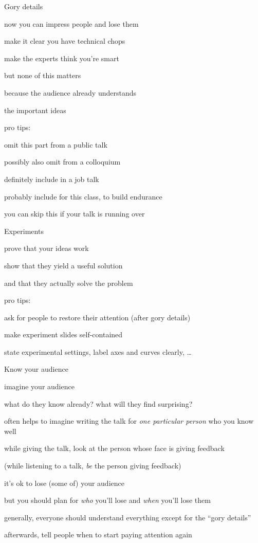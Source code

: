 \documentclass[presentation,xcolor={usenames,dvipsnames}]{beamer}
\begin{document}
\begin{frame}{Gory details}

\bit
\item now you can impress people and lose them
\item make it clear you have technical chops
\item make the experts think you're smart
\item but none of this matters
\item because the audience already understands
\item the important ideas
\eit

pro tips:
\bit
\item omit this part from a public talk
\item possibly also omit from a colloquium
\item definitely include in a job talk
\item probably include for this class, to build endurance
\item you can skip this if your talk is running over
\eit

\end{frame}

\begin{frame}{Experiments}

\bit
\item prove that your ideas work
\item show that they yield a useful solution
\item and that they actually solve the problem
\eit

pro tips:
\bit
\item ask for people to restore their attention (after gory details)
\item make experiment slides self-contained
\bit
\item state experimental settings, label axes and curves clearly, \ldots
\eit
\eit

\end{frame}

\begin{frame}{Know your audience}

imagine your audience
\bit
\item what do they know already? what will they find surprising?
\item often helps to imagine writing the talk for \emph{one particular person} who you know well
\item while giving the talk, look at the person whose face is giving feedback
\item (while listening to a talk, \emph{be} the person giving feedback)
\eit

it's ok to lose (some of) your audience
\bit
\item but you should plan for \emph{who} you'll lose and \emph{when} you'll lose them
\item generally, everyone should understand everything except for the ``gory details''
\item afterwards, tell people when to start paying attention again
\eit

\end{frame}
\end{document}
